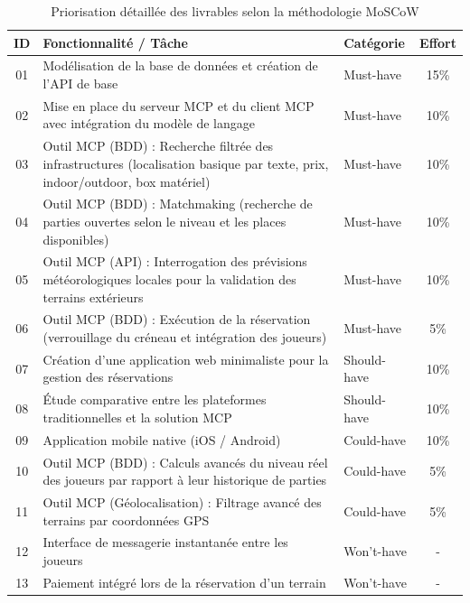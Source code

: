 \documentclass[12pt]{article}
\begin{document}
\begin{table}[H]
    \centering
    \renewcommand{\arraystretch}{1.3}
    \begin{tabularx}{\textwidth}{|c|X|l|c|}
        \hline
        \textbf{ID} & \textbf{Fonctionnalité / Tâche} & \textbf{Catégorie} & \textbf{Effort} \\ \hline
        01 & Modélisation de la base de données et création de l'API de base & Must-have & 15\% \\ \hline
        02 & Mise en place du serveur MCP et du client MCP avec intégration du modèle de langage & Must-have & 10\% \\ \hline
        03 & Outil MCP (BDD) : Recherche filtrée des infrastructures (localisation basique par texte, prix, indoor/outdoor, box matériel) & Must-have & 10\% \\ \hline
        04 & Outil MCP (BDD) : Matchmaking (recherche de parties ouvertes selon le niveau et les places disponibles) & Must-have & 10\% \\ \hline
        05 & Outil MCP (API) : Interrogation des prévisions météorologiques locales pour la validation des terrains extérieurs & Must-have & 10\% \\ \hline
        06 & Outil MCP (BDD) : Exécution de la réservation (verrouillage du créneau et intégration des joueurs) & Must-have & 5\% \\ \hline
        07 & Création d'une application web minimaliste pour la gestion des réservations & Should-have & 10\% \\ \hline
        08 & Étude comparative entre les plateformes traditionnelles et la solution MCP & Should-have & 10\% \\ \hline
        09 & Application mobile native (iOS / Android) & Could-have & 10\% \\ \hline
        10 & Outil MCP (BDD) : Calculs avancés du niveau réel des joueurs par rapport à leur historique de parties & Could-have & 5\% \\ \hline
        11 & Outil MCP (Géolocalisation) : Filtrage avancé des terrains par coordonnées GPS & Could-have & 5\% \\ \hline
        12 & Interface de messagerie instantanée entre les joueurs & Won't-have & - \\ \hline
        13 & Paiement intégré lors de la réservation d'un terrain & Won't-have & - \\ \hline
    \end{tabularx}
    \caption{Priorisation détaillée des livrables selon la méthodologie MoSCoW}
    \label{tab:moscow_features_detail}
\end{table}
\end{document}
